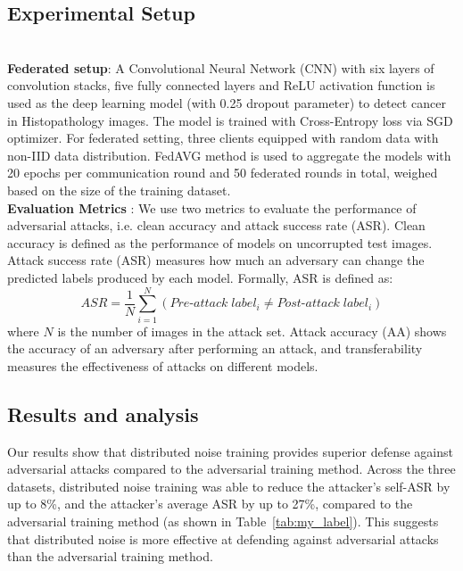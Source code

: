 \subsection{Experimental Setup }
\\\textbf{Federated setup}:
A Convolutional Neural Network (CNN) with six layers of convolution stacks, five fully connected layers and ReLU activation function is used as the deep learning model (with 0.25 dropout parameter) to detect cancer in Histopathology images. The model is trained with Cross-Entropy loss via SGD optimizer. For federated setting, three clients equipped with random data with non-IID data distribution. FedAVG method is used to aggregate the models with 20 epochs per communication round and 50 federated rounds in total, weighed based on the size of the training dataset.
\\\textbf{Evaluation Metrics }:
We use two metrics to evaluate the performance of adversarial attacks, i.e. clean accuracy and attack success rate (ASR). Clean accuracy is defined as the performance of models on uncorrupted test images. Attack success rate (ASR) measures how much an adversary can change the predicted labels produced by each model. Formally, ASR is defined as:
\begin{equation}
    ASR = \frac{1}{N}\sum\limits_{i=1}^{N} (Pre\text{-}attack\;label_{i}\neq Post\text{-}attack\;label_{i})
\end{equation}
where $N$ is the number of images in the attack set. Attack accuracy (AA) shows the accuracy of an adversary after performing an attack, and transferability measures the effectiveness of attacks on different models.
\subsection{Results and analysis}
Our results show that distributed noise training provides superior defense against adversarial attacks compared to the adversarial training method. 
Across the three datasets, distributed noise training was able to reduce the attacker's self-ASR by up to 8\%, and the attacker's average ASR by up to 27\%, compared to the  adversarial training method (as shown in Table~\ref{tab:my_label}). This suggests that distributed noise is more effective at defending against adversarial attacks than the adversarial training method.


